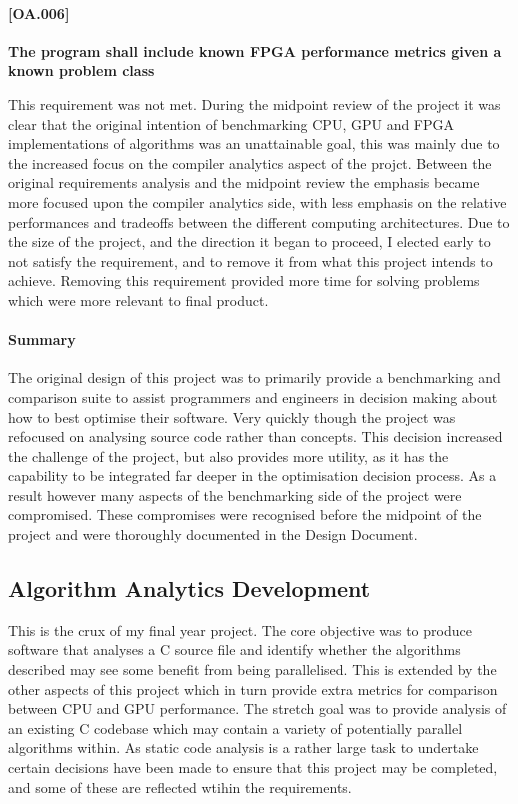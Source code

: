 \paragraph{[OA.006]}
\textbf{The program shall include known FPGA performance metrics given a known problem class}

This requirement was not met. During the midpoint review of the project it was clear that the
original intention of benchmarking CPU, GPU and FPGA implementations of algorithms was an
unattainable goal, this was mainly due to the increased focus on the compiler analytics aspect of
the projct. Between the original requirements analysis and the midpoint review the emphasis became
more focused upon the compiler analytics side, with less emphasis on the relative performances and
tradeoffs between the different computing architectures.  Due to the size of the project, and the
direction it began to proceed, I elected early to not satisfy the requirement, and to remove it from
what this project intends to achieve. Removing this requirement provided more time for solving
problems which were more relevant to final product.

\paragraph{Summary}
The original design of this project was to primarily provide a benchmarking and comparison suite to
assist programmers and engineers in decision making about how to best optimise their software.  Very
quickly though the project was refocused on analysing source code rather than concepts. This
decision increased the challenge of the project, but also provides more utility, as it has the
capability to be integrated far deeper in the optimisation decision process. As a result however
many aspects of the benchmarking side of the project were compromised. These compromises were
recognised before the midpoint of the project and were thoroughly documented in the Design Document.

\subsection{Algorithm Analytics Development}
This is the crux of my final year project. The core objective was to produce software that analyses
a C source file and identify whether the algorithms described may see some benefit from being
parallelised. This is extended by the other aspects of this project which in turn provide extra
metrics for comparison between CPU and GPU performance. The stretch goal was to provide analysis of
an existing C codebase which may contain a variety of potentially parallel algorithms within. As
static code analysis is a rather large task to undertake certain decisions have been made to ensure
that this project may be completed, and some of these are reflected wtihin the requirements.

